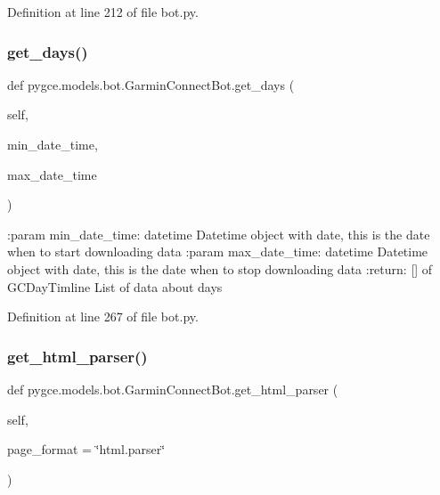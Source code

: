 Definition at line 212 of file bot.\+py.

\mbox{\label{classpygce_1_1models_1_1bot_1_1_garmin_connect_bot_a18ab2d80266a9da67186bcba6b4856b9}} 
\subsubsection{\texorpdfstring{get\+\_\+days()}{get\_days()}}
{\footnotesize\ttfamily def pygce.\+models.\+bot.\+Garmin\+Connect\+Bot.\+get\+\_\+days (\begin{DoxyParamCaption}\item[{}]{self,  }\item[{}]{min\+\_\+date\+\_\+time,  }\item[{}]{max\+\_\+date\+\_\+time }\end{DoxyParamCaption})}

\begin{DoxyVerb}:param min_date_time: datetime
    Datetime object with date, this is the date when to start downloading data
:param max_date_time: datetime
    Datetime object with date, this is the date when to stop downloading data
:return: [] of GCDayTimline
    List of data about days
\end{DoxyVerb}
 

Definition at line 267 of file bot.\+py.

\mbox{\label{classpygce_1_1models_1_1bot_1_1_garmin_connect_bot_ad276eeef1f1fa248b1461235bbbef2b1}} 
\subsubsection{\texorpdfstring{get\+\_\+html\+\_\+parser()}{get\_html\_parser()}}
{\footnotesize\ttfamily def pygce.\+models.\+bot.\+Garmin\+Connect\+Bot.\+get\+\_\+html\+\_\+parser (\begin{DoxyParamCaption}\item[{}]{self,  }\item[{}]{page\+\_\+format = {\ttfamily \char`\"{}html.parser\char`\"{}} }\end{DoxyParamCaption})}



